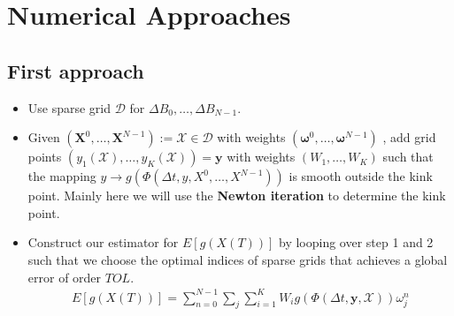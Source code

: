 \documentclass[11pt]{article}
\begin{document}
\section{Numerical Approaches}

\subsection{First approach}
\begin{itemize}
	\item Use sparse grid $\mathcal{D}$ for $\Delta B_0, \dots, \Delta B_{N-1}$.
	\item Given $(\mathbf{X}^0,\dots, \mathbf{X}^{N-1}):=\mathcal{X} \in \mathcal{D}$ with weights $(\boldsymbol{\omega}^0,\dots,\boldsymbol{\omega}^{N-1})$ , add grid points $(y_1(\mathcal{X}),\dots,y_K(\mathcal{X}))=\mathbf{y}$ with weights $(W_1,\dots, W_K)$ such that the mapping $y \rightarrow g(\Phi(\Delta t, y, X^0,\dots, X^{N-1}))$ is smooth outside the kink point. Mainly here we will use the \textbf{Newton iteration}  to determine the kink point.
	\item Construct our estimator for $E[g(X(T))]$ by looping over step 1 and 2 such that we choose the optimal indices of sparse grids that achieves a global error of order $TOL$.
	\begin{align*}
	E[g(X(T))]=\sum_{n=0}^{N-1}\sum_{j} \sum_{i=1}^K W_i g(\Phi(\Delta t,\mathbf{y},\mathcal{X})) \omega_{j}^n 
	\end{align*} 
\end{itemize}
\end{document}
